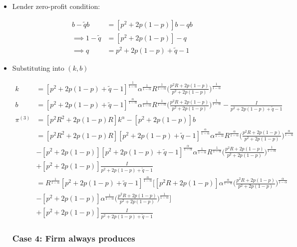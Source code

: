 \documentclass{article}
\begin{document}
\begin{itemize}
\item Lender zero-profit condition:

\begin{align*}
b - \tilde q b &= [p^2 + 2p(1-p)]b - qb\\
\implies
1 - \tilde q  &= [p^2 + 2p(1-p)] - q\\
\implies
q  &= p^2 + 2p(1-p) + \tilde q - 1
\end{align*}

\item Substituting into $(k,b)$

\begin{align*}
k 
&= [p^2 + 2p(1-p) + \tilde q - 1]^{\frac{1}{1-\alpha}} \alpha^{\frac{1}{1-\alpha}} R^{\frac{1}{1-\alpha}}\Bigg(\frac{p^2 R + 2p(1-p) }{p^2 + 2p(1-p)}\Bigg)^{\frac{1}{1-\alpha}}\\
b &= [p^2 + 2p(1-p) + \tilde q - 1]^{\frac{\alpha}{1-\alpha}} \alpha^{\frac{1}{1-\alpha}} R^{\frac{1}{1-\alpha}}\Bigg(\frac{p^2 R + 2p(1-p) }{p^2 + 2p(1-p)}\Bigg)^{\frac{1}{1-\alpha}} - \frac{I}{p^2 + 2p(1-p) + \tilde q - 1}\\
\pi^{(3)} &= 
[p^2 R^2 + 2p(1-p) R ] k^\alpha - [p^2 + 2p(1-p)]b \\
&= 
[p^2 R^2 + 2p(1-p) R ] [p^2 + 2p(1-p) + \tilde q - 1]^{\frac{\alpha}{1-\alpha}} \alpha^{\frac{\alpha}{1-\alpha}} R^{\frac{\alpha}{1-\alpha}}\Bigg(\frac{p^2 R + 2p(1-p) }{p^2 + 2p(1-p)}\Bigg)^{\frac{\alpha}{1-\alpha}} \\&- [p^2 + 2p(1-p)][p^2+2p(1-p) + \tilde q - 1]^{\frac{\alpha}{1-\alpha}} \alpha^{\frac{1}{1-\alpha}} R^{\frac{1}{1-\alpha}}\Bigg(\frac{p^2 R + 2p(1-p) }{p^2 + 2p(1-p)}\Bigg)^{\frac{1}{1-\alpha}} \\&+ [p^2 + 2p(1-p)] \frac{I}{p^2 + 2p(1-p) + \tilde q - 1}\\
&= 
R^{\frac{1}{1-\alpha}} [p^2 + 2p(1-p) + \tilde q - 1]^{\frac{\alpha}{1-\alpha}} \Bigg[[p^2 R + 2p(1-p)  ]  \alpha^{\frac{\alpha}{1-\alpha}} \Bigg(\frac{p^2 R + 2p(1-p) }{p^2 + 2p(1-p)}\Bigg)^{\frac{\alpha}{1-\alpha}} \\&- [p^2 + 2p(1-p)] \alpha^{\frac{1}{1-\alpha}} \Bigg(\frac{p^2 R + 2p(1-p) }{p^2 + 2p(1-p)}\Bigg)^{\frac{1}{1-\alpha}} \Bigg]\\&+ [p^2 + 2p(1-p)] \frac{I}{p^2 + 2p(1-p) + \tilde q - 1}
\end{align*}

\subsubsection*{Case 4: Firm always produces}


\end{itemize}
\end{document}
